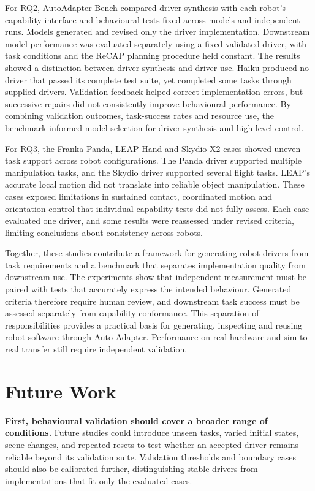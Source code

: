 For RQ2, AutoAdapter-Bench compared driver synthesis with each robot's
capability interface and behavioural tests fixed across models and independent
runs. Models generated and revised only the driver implementation.
Downstream model performance was evaluated separately using a fixed validated
driver, with task conditions and the ReCAP planning procedure held constant.
The results showed a distinction between driver synthesis
and driver use. Haiku produced no driver that passed its complete test suite,
yet completed some tasks through supplied drivers. Validation feedback helped
correct implementation errors, but successive repairs did not consistently
improve behavioural performance. By combining validation outcomes, task-success
rates and resource use, the benchmark informed model selection for driver
synthesis and high-level control.

For RQ3, the Franka Panda, LEAP Hand and Skydio X2 cases showed uneven task
support across robot configurations. The Panda driver supported multiple
manipulation tasks, and the Skydio driver supported several flight tasks.
LEAP's accurate local motion did not translate into reliable object
manipulation. These cases exposed limitations in sustained contact,
coordinated motion and orientation control that individual capability tests
did not fully assess. Each case evaluated one driver, and some results were
reassessed under revised criteria, limiting conclusions about consistency
across robots.

Together, these studies contribute a framework for generating robot drivers
from task requirements and a benchmark that separates implementation quality
from downstream use. The experiments show that independent measurement must be
paired with tests that accurately express the intended behaviour. Generated
criteria therefore require human review, and downstream task success must be
assessed separately from capability conformance. This separation of
responsibilities provides a practical basis for generating, inspecting and
reusing robot software through Auto-Adapter. Performance on real hardware and
sim-to-real transfer still require independent validation.

\section[Future Work]{Future Work}

\textbf{First, behavioural validation should cover a broader range of
conditions.} Future studies could introduce unseen tasks, varied initial
states, scene changes, and repeated resets to test whether an accepted driver
remains reliable beyond its validation suite. Validation thresholds and
boundary cases should also be calibrated further, distinguishing stable
drivers from implementations that fit only the evaluated cases.


